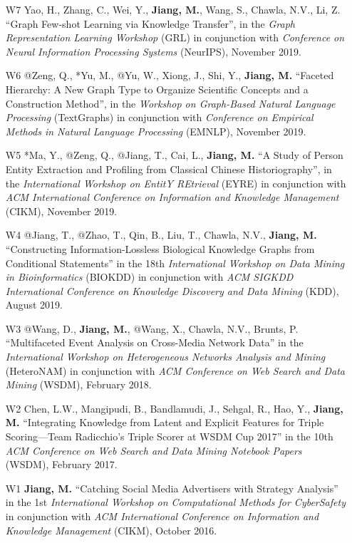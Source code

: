 \documentclass[10pt]{article}
\newenvironment{myindentpar}[1]%
{\begin{list}{}%
         {\setlength{\leftmargin}{#1}}%
         \item[]%
}
{\end{list}}
\newcounter{list}
\begin{document}
\begin{myindentpar}{0.00cm}
\begin{enumerate}[leftmargin=.5cm]
\item[W7] Yao, H., Zhang, C., Wei, Y., \textbf{Jiang, M.}, Wang, S., Chawla, N.V., Li, Z. ``Graph Few-shot Learning via Knowledge Transfer'', in the \textit{Graph Representation Learning Workshop} (GRL) in conjunction with \textit{Conference on Neural Information Processing Systems} (NeurIPS), November 2019.
	
\item[W6] @Zeng, Q., *Yu, M., @Yu, W., Xiong, J., Shi, Y., \textbf{Jiang, M.} ``Faceted Hierarchy: A New Graph Type to Organize Scientific Concepts and a Construction Method'', in the \textit{Workshop on Graph-Based Natural Language Processing} (TextGraphs) in conjunction with \textit{Conference on Empirical Methods in Natural Language Processing} (EMNLP), November 2019.

\item[W5] *Ma, Y., @Zeng, Q., @Jiang, T., Cai, L., \textbf{Jiang, M.} ``A Study of Person Entity Extraction and Profiling from Classical Chinese Historiography'', in the \textit{International Workshop on EntitY REtrieval} (EYRE) in conjunction with \textit{ACM International Conference on Information and Knowledge Management} (CIKM), November 2019.

\item[W4] @Jiang, T., @Zhao, T., Qin, B., Liu, T., Chawla, N.V., \textbf{Jiang, M.} ``Constructing Information-Lossless Biological Knowledge Graphs from Conditional Statements'' in the 18th \textit{International Workshop on Data Mining in Bioinformatics} (BIOKDD) in conjunction with \textit{ACM SIGKDD International Conference on Knowledge Discovery and Data Mining} (KDD), August 2019.

\item[W3] @Wang, D., \textbf{Jiang, M.}, @Wang, X., Chawla, N.V., Brunts, P. ``Multifaceted Event Analysis on Cross-Media Network Data'' in the \textit{International Workshop on Heterogeneous Networks Analysis and Mining} (HeteroNAM) in conjunction with \textit{ACM Conference on Web Search and Data Mining} (WSDM), February 2018.

\item[W2] Chen, L.W., Mangipudi, B., Bandlamudi, J., Sehgal, R., Hao, Y., \textbf{Jiang, M.} ``Integrating Knowledge from Latent and Explicit Features for Triple Scoring—Team Radicchio's Triple Scorer at WSDM Cup 2017'' in the 10th \textit{ACM Conference on Web Search and Data Mining Notebook Papers} (WSDM), February 2017.

\item[W1] \textbf{Jiang, M.} ``Catching Social Media Advertisers with Strategy Analysis'' in the 1st \textit{International Workshop on Computational Methods for CyberSafety} in conjunction with \textit{ACM International Conference on Information and Knowledge Management} (CIKM), October 2016.


\end{enumerate}
\end{myindentpar}
\end{document}
